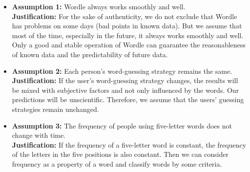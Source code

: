 \documentclass[12pt]{article}
\begin{document}
\begin{itemize}%
	\item \textbf{Assumption 1: }Wordle always works smoothly and well.    \\[1pt]
    \textbf{Justification:} For the sake of authenticity, we do not exclude that Wordle has problems on some days (bad points in known data). But we assume that most of the time, especially in the future, it always works smoothly and well.
    Only a good and stable operation of Wordle can guarantee the reasonableness of known data and the predictability of future data.
    
    \item \textbf{Assumption 2: }Each person's word-guessing strategy remains the same.    \\[1pt]
    \textbf{Justification:} If the user's word-guessing strategy changes, the results will be mixed with subjective factors and not only influenced by the words. Our predictions will be unscientific. Therefore, we assume that the users' guessing strategies remain unchanged.

    \item \textbf{Assumption 3: }The frequency of people using five-letter words does not change with time.\\[1pt]
        \textbf{Justification:} If the frequency of a five-letter word is constant, the frequency of the letters in the five positions is also constant. Then we can consider frequency as a property of a word and classify words by some criteria.

\end{itemize}
\end{document}
